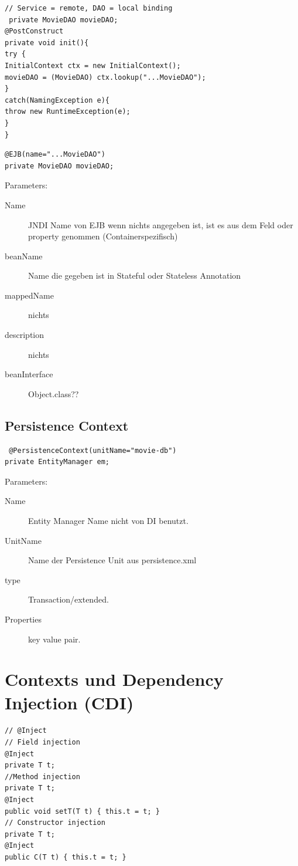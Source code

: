 \documentclass[a4paper,10pt]{scrreprt}
\begin{document}
\begin{lstlisting}[caption=JNDI Lookup DI]
// Service = remote, DAO = local binding
 private MovieDAO movieDAO;
@PostConstruct
private void init(){
try {
InitialContext ctx = new InitialContext();
movieDAO = (MovieDAO) ctx.lookup("...MovieDAO");
}
catch(NamingException e){
throw new RuntimeException(e);
}
}
\end{lstlisting}

\begin{lstlisting}[caption=Dependency Injection with Annotation]
 @EJB(name="...MovieDAO")
private MovieDAO movieDAO;
\end{lstlisting}
Parameters: 
\begin{description}
 \item [Name] JNDI Name von EJB wenn nichts angegeben ist, ist es aus dem Feld oder property genommen 
(Containerspezifisch)
\item[beanName] Name die gegeben ist in Stateful oder Stateless Annotation
\item[mappedName] nichts
\item [description] nichts
\item [beanInterface] Object.class??
\end{description}

\subsection{Persistence Context}
\begin{lstlisting}
 @PersistenceContext(unitName="movie-db")
private EntityManager em;
\end{lstlisting}
Parameters:
\begin{description}
 \item [Name] Entity Manager Name nicht von DI benutzt.
 \item [UnitName] Name der Persistence Unit aus persistence.xml
 \item [type] Transaction/extended.
 \item [Properties] key value pair.
\end{description}

\section{Contexts und Dependency Injection (CDI)}

\begin{lstlisting}
// @Inject
// Field injection
@Inject
private T t;
//Method injection
private T t;
@Inject
public void setT(T t) { this.t = t; }
// Constructor injection
private T t;
@Inject
public C(T t) { this.t = t; }
\end{lstlisting}
\end{document}
